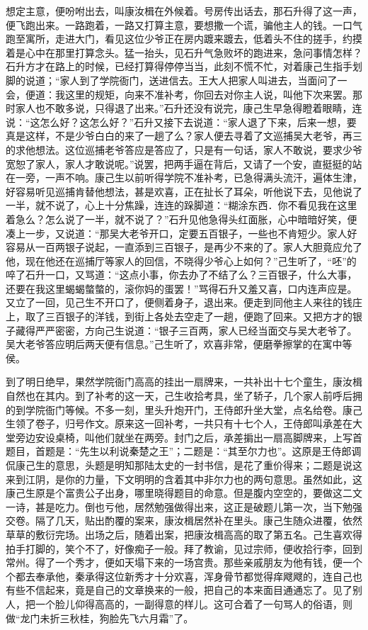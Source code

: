 \documentclass[12pt,UTF8]{ctexbook}
\begin{document}
{{{想定主意，便吩咐出去，叫康汝楫在外候着。号房传出话去，那石升得了这一声，便飞跑出来。一路跑着，一路又打算主意，要想撒一个谎，骗他主人的钱。一口气跑至寓所，走进大门，看见这位少爷正在房内踱来踱去，低着头不住的搓手，约摸着是心中在那里打算念头。猛一抬头，见石升气急败坏的跑进来，急问事情怎样？石升方才在路上的时候，已经打算得停停当当，此刻不慌不忙，对着康己生指手划脚的说道；“家人到了学院衙门，送进信去。王大人把家人叫进去，当面问了一会，便道：我这里的规矩，向来不准补考，你回去对你主人说，叫他下次来罢。那时家人也不敢多说，只得退了出来。”石升还没有说完，康己生早急得瞪着眼睛，连说：“这怎么好？这怎么好？”石升又接下去说道：“家人退了下来，后来一想，要真是这样，不是少爷白白的来了一趟了么？家人便去寻着了文巡捕吴大老爷，再三的求他想法。这位巡捕老爷答应是答应了，只是有一句话，家人不敢说，要求少爷宽恕了家人，家人才敢说呢。”说罢，把两手逼在背后，又请了一个安，直挺挺的站在一旁，一声不响。康己生以前听得学院不准补考，已急得满头流汗，遍体生津，好容易听见巡捕肯替他想法，甚是欢喜，正在扯长了耳朵，听他说下去，见他说了一半，就不说了，心上十分焦躁，连连的跺脚道：“糊涂东西．你不看见我在这里着急么？怎么说了一半，就不说了？”石升见他急得头红面胀，心中暗暗好笑，便凑上一步，又说道：“那吴大老爷开口，定要五百银子，一些也不肯短少。家人好容易从一百两银子说起，一直添到三百银子，是再少不来的了。家人大胆竟应允了他，现在他还在巡捕厅等家人的回信，不晓得少爷心上如何？”己生听了，“呸”的啐了石升一口，又骂道：“这点小事，你去办了不结了么？三百银子，什么大事，还要在我这里蝎蝎螫螫的，滚你妈的蛋罢！”骂得石升又羞又喜，口内连声应是。又立了一回，见己生不开口了，便侧着身子，退出来。便走到同他主人来往的钱庄上，取了三百银子的洋钱，到街上各处去空走了一趟，便跑了回来。又把方才的银子藏得严严密密，方向己生说道：“银子三百两，家人已经当面交与吴大老爷了。吴大老爷答应明后两天便有信息。”己生听了，欢喜非常，便磨拳擦掌的在寓中等侯。

到了明日绝早，果然学院衙门高高的挂出一扇牌来，一共补出十七个童生，康汝楫自然也在其内。到了补考的这一天，己生收拾考具，坐了轿子，几个家人前呼后拥的到学院衙门等候。不多一刻，里头升炮开门，王侍郎升坐大堂，点名给卷。康己生领了卷子，归号作文。原来这一回补考，一共只有十七个人，王侍郎叫承差在大堂旁边安设桌椅，叫他们就坐在两旁。封门之后，承差掮出一扇高脚牌来，上写首题目，首题是：“先生以利说秦楚之王”；二题是：“其至尔力也”。这原是王侍郎调侃康己生的意思，头题是明知那陆太史的一封书信，是花了重价得来；二题是说这来到江阴，是你的力量，下文明明的含着其中非尔力也的两句意思。虽然如此，这康己生原是个富贵公子出身，哪里晓得题目的命意。但是腹内空空的，要做这二文一诗，甚是吃力。倒也亏他，居然勉强做得出来，这正是破题儿第一次，当下勉强交卷。隔了几天，贴出酌覆的案来，康汝楫居然补在里头。康己生随众进覆，依然草草的敷衍完场。出场之后，随着出案，把康汝楫高高的取了第五名。己生喜欢得拍手打脚的，笑个不了，好像痴子一般。拜了教谕，见过宗师，便收拾行李，回到常州。得了一个秀才，便如天塌下来的一场宫贵。那些亲戚朋友为他有钱，便一个个都去奉承他，秦承得这位新秀才十分欢喜，浑身骨节都觉得痒飕飕的，连自己也有些不信起来，竟是自己的文章换来的一般，把自己的本来面目通通忘了。见了别人，把一个脸儿仰得高高的，一副得意的样儿。这可合着了一句骂人的俗语，则做“龙门未折三秋桂，狗脸先飞六月霜”了。

}}}
\end{document}
